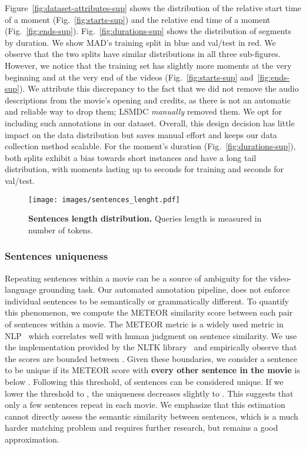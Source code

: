 \documentclass[10pt,twocolumn,letterpaper]{article}
\begin{document}
\newpage
Figure~\ref{fig:dataset-attributes-sup} shows the distribution of the relative start time of a moment (Fig.~\ref{fig:starts-sup}) and the relative end time of a moment (Fig.~\ref{fig:ends-sup}). Fig.~\ref{fig:durations-sup} shows the distribution of segments by duration. We show MAD's training split in blue and val/test in red. We observe that the two splits have similar distributions in all three sub-figures. However, we notice that the training set has slightly more moments at the very beginning and at the very end of the videos (Fig.~\ref{fig:starts-sup} and~\ref{fig:ends-sup}). We attribute this discrepancy to the fact that we did not remove the audio descriptions from the movie's opening and credits, as there is not an automatic and reliable way to drop them; LSMDC \textit{manually} removed them. We opt for including such annotations in our dataset. Overall, this design decision has little impact on the data distribution but saves manual effort and keeps our data collection method scalable. For the moment's duration (Fig.~\ref{fig:durations-sup}), both splits exhibit a bias towards short instances and have a long tail distribution, with moments lasting up to  seconds for training and  seconds for val/test.
\begin{figure}[t]
    \vspace{-0.5cm}
    \centering
    \texttt{[image: images/sentences\_lenght.pdf]}
    \vspace{-0.2cm}
    \caption{\textbf{Sentences length distribution. } Queries length is measured in number of tokens. 
    }
    \label{fig:sentences_length}
    \vspace{-0.5cm}
\end{figure} 
\subsubsection{Sentences uniqueness}
Repeating sentences within a movie can be a source of ambiguity for the video-language grounding task. Our automated annotation pipeline, does not enforce individual sentences to be semantically or grammatically different. To quantify this phenomenon, we compute the METEOR similarity score between each pair of sentences within a movie.
The METEOR metric is a widely used metric in NLP~\cite{Krishna_2017_ICCV,rohrbach2014coherent} which correlates well with human judgment on sentence similarity. We use the implementation provided by the NLTK library~\cite{bird2009natural} and empirically observe that the scores are bounded between . Given these boundaries, we consider a sentence to be unique if its METEOR score with \textbf{every other sentence in the movie} is below .
Following this threshold,  of sentences can be considered unique. If we lower the threshold to , the uniqueness decreases slightly to . This suggests that only a few sentences repeat in each movie. 
We emphasize that this estimation cannot directly assess the semantic similarity between sentences, which is a much harder matching problem and requires further research, but remains a good approximation. 
\end{document}
